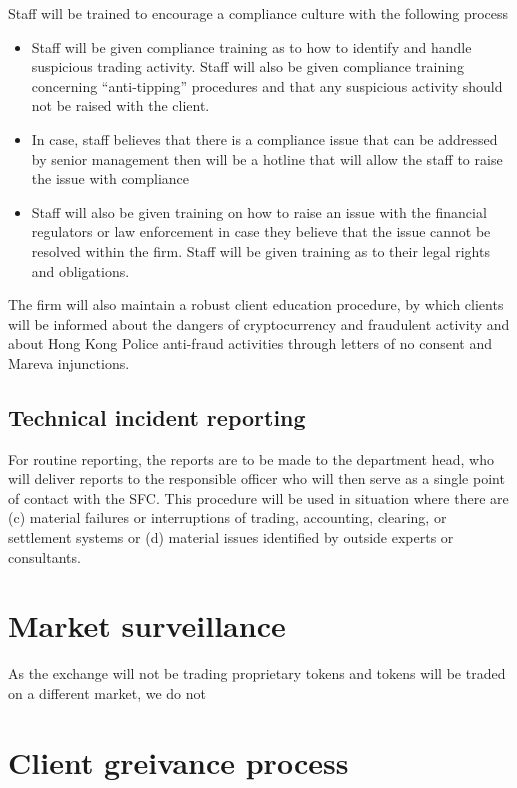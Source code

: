 Staff will be trained to encourage a compliance culture with the
following process
\begin{itemize}
  \item Staff will be given compliance training as to how to identify
    and handle suspicious trading activity.  Staff will also be given
    compliance training concerning ``anti-tipping'' procedures and
    that any suspicious activity should not be raised with the client.
  \item In case, staff believes that there is a compliance issue that
    can be addressed by senior management then will be a hotline that
    will allow the staff to raise the issue with compliance
  \item Staff will also be given training on how to raise an issue
    with the financial regulators or law enforcement in case they
    believe that the issue cannot be resolved within the firm.  Staff
    will be given training as to their legal rights and obligations.
\end{itemize}

The firm will also maintain a robust client education procedure, by
which clients will be informed about the dangers of cryptocurrency and
fraudulent activity and about Hong Kong Police anti-fraud activities
through letters of no consent and Mareva injunctions.

\subsection{Technical incident reporting}

For routine reporting, the reports are to be made to the department
head, who will deliver reports to the responsible officer who will
then serve as a single point of contact with the SFC.  This procedure
will be used in situation where there are (c) material failures or
interruptions of trading, accounting, clearing, or settlement systems
or (d) material issues identified by outside experts or consultants.


\section{Market surveillance}

As the exchange will not be trading proprietary tokens and tokens will
be traded on a different market, we do not 

\section{Client greivance process}

